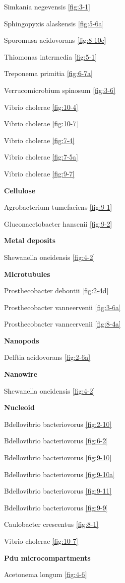 \documentclass[]{tufte-book}
\begin{document}
Simkania negevensis \ref{fig:3-1}

Sphingopyxis alaskensis \ref{fig:5-6a}

Sporomusa acidovorans \ref{fig:8-10c}

Thiomonas intermedia \ref{fig:5-1}

Treponema primitia \ref{fig:6-7a}

Verrucomicrobium spinosum \ref{fig:3-6}

Vibrio cholerae \ref{fig:10-4}

Vibrio cholerae \ref{fig:10-7}

Vibrio cholerae \ref{fig:7-4}

Vibrio cholerae \ref{fig:7-5a}

Vibrio cholerae \ref{fig:9-7}

\textbf{Cellulose}

Agrobacterium tumefaciens \ref{fig:9-1}

Gluconacetobacter hansenii \ref{fig:9-2}

\textbf{Metal deposits}

Shewanella oneidensis \ref{fig:4-2}

\textbf{Microtubules}

Prosthecobacter debontii \ref{fig:2-4d}

Prosthecobacter vanneervenii \ref{fig:3-6a}

Prosthecobacter vanneervenii \ref{fig:8-4a}

\textbf{Nanopods}

Delftia acidovorans \ref{fig:2-6a}

\textbf{Nanowire}

Shewanella oneidensis \ref{fig:4-2}

\textbf{Nucleoid}

Bdellovibrio bacteriovorus \ref{fig:2-10}

Bdellovibrio bacteriovorus \ref{fig:6-2}

Bdellovibrio bacteriovorus \ref{fig:9-10}

Bdellovibrio bacteriovorus \ref{fig:9-10a}

Bdellovibrio bacteriovorus \ref{fig:9-11}

Bdellovibrio bacteriovorus \ref{fig:9-9}

Caulobacter crescentus \ref{fig:8-1}

Vibrio cholerae \ref{fig:10-7}

\textbf{Pdu microcompartments}

Acetonema longum \ref{fig:4-6}
\end{document}
